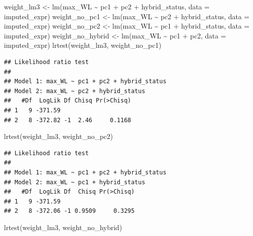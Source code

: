 \documentclass[
]{article}
\newenvironment{Shaded}{\begin{snugshade}}{\end{snugshade}}
\newcommand{\AttributeTok}[1]{\textcolor[rgb]{0.77,0.63,0.00}{#1}}
\newcommand{\FunctionTok}[1]{\textcolor[rgb]{0.00,0.00,0.00}{#1}}
\newcommand{\NormalTok}[1]{#1}
\newcommand{\OtherTok}[1]{\textcolor[rgb]{0.56,0.35,0.01}{#1}}
\newcommand{\SpecialCharTok}[1]{\textcolor[rgb]{0.00,0.00,0.00}{#1}}
\begin{document}
\begin{Shaded}
\begin{Highlighting}[]
\NormalTok{weight\_lm3 }\OtherTok{\textless{}{-}} \FunctionTok{lm}\NormalTok{(max\_WL }\SpecialCharTok{\textasciitilde{}}\NormalTok{ pc1 }\SpecialCharTok{+}\NormalTok{ pc2 }\SpecialCharTok{+}\NormalTok{ hybrid\_status, }\AttributeTok{data =}\NormalTok{ imputed\_expr)}
\NormalTok{weight\_no\_pc1 }\OtherTok{\textless{}{-}} \FunctionTok{lm}\NormalTok{(max\_WL }\SpecialCharTok{\textasciitilde{}}\NormalTok{ pc2 }\SpecialCharTok{+}\NormalTok{ hybrid\_status, }\AttributeTok{data =}\NormalTok{ imputed\_expr)}
\NormalTok{weight\_no\_pc2 }\OtherTok{\textless{}{-}} \FunctionTok{lm}\NormalTok{(max\_WL }\SpecialCharTok{\textasciitilde{}}\NormalTok{ pc1  }\SpecialCharTok{+}\NormalTok{ hybrid\_status, }\AttributeTok{data =}\NormalTok{ imputed\_expr)}
\NormalTok{weight\_no\_hybrid }\OtherTok{\textless{}{-}} \FunctionTok{lm}\NormalTok{(max\_WL }\SpecialCharTok{\textasciitilde{}}\NormalTok{ pc1 }\SpecialCharTok{+}\NormalTok{ pc2, }\AttributeTok{data =}\NormalTok{ imputed\_expr)}
\FunctionTok{lrtest}\NormalTok{(weight\_lm3, weight\_no\_pc1)}
\end{Highlighting}
\end{Shaded}

\begin{verbatim}
## Likelihood ratio test
## 
## Model 1: max_WL ~ pc1 + pc2 + hybrid_status
## Model 2: max_WL ~ pc2 + hybrid_status
##   #Df  LogLik Df Chisq Pr(>Chisq)
## 1   9 -371.59                    
## 2   8 -372.82 -1  2.46     0.1168
\end{verbatim}

\begin{Shaded}
\begin{Highlighting}[]
\FunctionTok{lrtest}\NormalTok{(weight\_lm3, weight\_no\_pc2)}
\end{Highlighting}
\end{Shaded}

\begin{verbatim}
## Likelihood ratio test
## 
## Model 1: max_WL ~ pc1 + pc2 + hybrid_status
## Model 2: max_WL ~ pc1 + hybrid_status
##   #Df  LogLik Df  Chisq Pr(>Chisq)
## 1   9 -371.59                     
## 2   8 -372.06 -1 0.9509     0.3295
\end{verbatim}

\begin{Shaded}
\begin{Highlighting}[]
\FunctionTok{lrtest}\NormalTok{(weight\_lm3, weight\_no\_hybrid)}
\end{Highlighting}
\end{Shaded}
\end{document}
